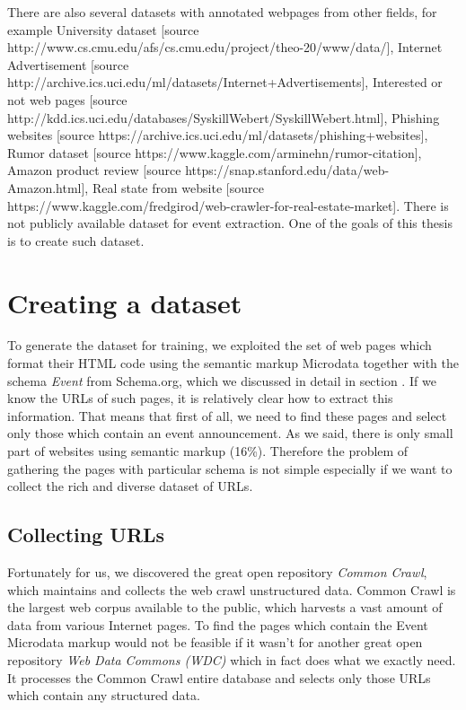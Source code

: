 There are also several datasets with annotated webpages from other fields, for example University dataset [source http://www.cs.cmu.edu/afs/cs.cmu.edu/project/theo-20/www/data/], Internet Advertisement [source  http://archive.ics.uci.edu/ml/datasets/Internet+Advertisements], Interested or not web pages [source http://kdd.ics.uci.edu/databases/SyskillWebert/SyskillWebert.html], Phishing websites [source https://archive.ics.uci.edu/ml/datasets/phishing+websites], Rumor dataset [source https://www.kaggle.com/arminehn/rumor-citation], Amazon product review [source https://snap.stanford.edu/data/web-Amazon.html], Real state from website [source https://www.kaggle.com/fredgirod/web-crawler-for-real-estate-market]. There is not publicly available dataset for event extraction. One of the goals of this thesis is to create such dataset.

\section{Creating a dataset}

To generate the dataset for training, we exploited the set of web pages which format their HTML code using the semantic markup Microdata together with the schema \textit{Event} from Schema.org, which we discussed in detail in section   . If we know the URLs of such pages, it is relatively clear how to extract this information. That means that first of all, we need to find these pages and select only those which contain an event announcement. As we said, there is only small part of websites using semantic markup (16\%). Therefore the problem of gathering the pages with particular schema is not simple especially if we want to collect the rich and diverse dataset of URLs. \\

\subsection{Collecting URLs}

Fortunately for us, we discovered the great open repository \textit{Common Crawl}, which maintains and collects the web crawl unstructured data. Common Crawl is the largest web corpus available to the public, which harvests a vast amount of data from various Internet pages. To find the pages which contain the Event Microdata markup would not be feasible if it wasn't for another great open repository \textit{Web Data Commons (WDC)} which in fact does what we exactly need. It processes the Common Crawl entire database and selects only those URLs which contain any structured data.\\

